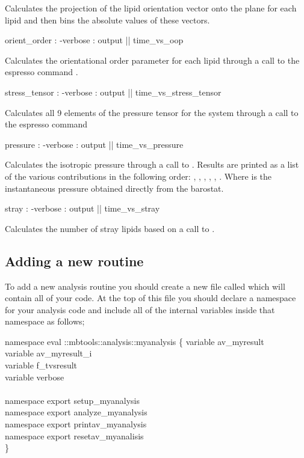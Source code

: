 Calculates the projection of the lipid orientation vector onto the  plane for each lipid and then bins the absolute values of these vectors.
\begin{code}
  orient_order : -verbose : output || time_vs_oop
\end{code}
Calculates the orientational order parameter  for each lipid through a call to the espresso command .
\begin{code}
  stress_tensor : -verbose : output || time_vs_stress_tensor
\end{code}
Calculates all 9 elements of the pressure tensor for the system through a call to the espresso command 
\begin{code}
  pressure : -verbose : output || time_vs_pressure
\end{code}
Calculates the isotropic pressure through a call to . Results are printed as a list of the various contributions in the following order: , , , , , . Where  is the instantaneous pressure obtained directly from the barostat.
\begin{code}
  stray : -verbose : output || time_vs_stray
\end{code}
Calculates the number of stray lipids based on a call to .


\subsection{Adding a new routine}

To add a new analysis routine you should create a new file called    which will contain all of your code. At the top of this file you should declare a namespace for your analysis code and include all of the internal variables inside that namespace as follows;

\begin{code}
    namespace eval ::mbtools::analysis::myanalysis \{
	variable av_myresult \\
	variable av_myresult_i\\
	variable f_tvsresult\\
	variable verbose\\
	\\
	namespace export setup_myanalysis\\
	namespace export analyze_myanalysis\\
	namespace export printav_myanalysis\\
	namespace export resetav_myanalisis\\
    \}\\
  \end{code}

